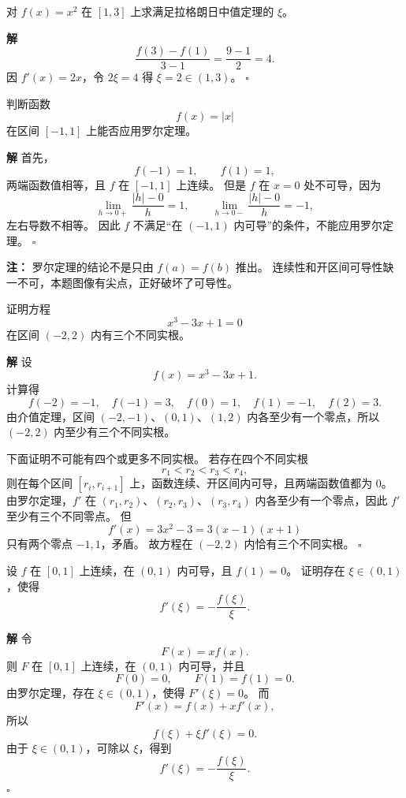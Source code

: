 \documentclass[fontset=fandol]{ctexart}
\newenvironment{solution}{\par\noindent\textbf{解}\quad}{\hfill$\square$\par\vspace{0.8em}}
\newenvironment{warning}{\par\noindent\textbf{注：}\quad}{\par\vspace{0.8em}}
\begin{document}
\begin{example}[验证中值定理]
对 $f(x)=x^2$ 在 $[1,3]$ 上求满足拉格朗日中值定理的 $\xi$。
\end{example}
\begin{solution}
\[
\frac{f(3)-f(1)}{3-1}=\frac{9-1}{2}=4.
\]
因 $f'(x)=2x$，令 $2\xi=4$ 得 $\xi=2\in(1,3)$。
\end{solution}

\begin{example}[罗尔定理的条件核查]
判断函数
\[
f(x)=|x|
\]
在区间 $[-1,1]$ 上能否应用罗尔定理。
\end{example}
\begin{solution}
首先，
\[
f(-1)=1,\qquad f(1)=1,
\]
两端函数值相等，且 $f$ 在 $[-1,1]$ 上连续。 但是 $f$ 在 $x=0$ 处不可导，因为
\[
\lim_{h\to0+}\frac{|h|-0}{h}=1,\qquad
\lim_{h\to0-}\frac{|h|-0}{h}=-1,
\]
左右导数不相等。 因此 $f$ 不满足“在 $(-1,1)$ 内可导”的条件，不能应用罗尔定理。
\end{solution}
\begin{warning}
罗尔定理的结论不是只由 $f(a)=f(b)$ 推出。 连续性和开区间可导性缺一不可，本题图像有尖点，正好破坏了可导性。
\end{warning}

\begin{example}[罗尔定理证明方程根的个数]
证明方程
\[
x^3-3x+1=0
\]
在区间 $(-2,2)$ 内有三个不同实根。
\end{example}
\begin{solution}
设
\[
f(x)=x^3-3x+1.
\]
计算得
\[
f(-2)=-1,\quad f(-1)=3,\quad f(0)=1,\quad f(1)=-1,\quad f(2)=3.
\]
由介值定理，区间 $(-2,-1)$、$(0,1)$、$(1,2)$ 内各至少有一个零点，所以 $(-2,2)$ 内至少有三个不同实根。

下面证明不可能有四个或更多不同实根。 若存在四个不同实根
\[
r_1<r_2<r_3<r_4,
\]
则在每个区间 $[r_i,r_{i+1}]$ 上，函数连续、开区间内可导，且两端函数值都为 $0$。 由罗尔定理，$f'$ 在 $(r_1,r_2)$、$(r_2,r_3)$、$(r_3,r_4)$ 内各至少有一个零点，因此 $f'$ 至少有三个不同零点。 但
\[
f'(x)=3x^2-3=3(x-1)(x+1)
\]
只有两个零点 $-1,1$，矛盾。 故方程在 $(-2,2)$ 内恰有三个不同实根。
\end{solution}

\begin{example}[构造辅助函数]
设 $f$ 在 $[0,1]$ 上连续，在 $(0,1)$ 内可导，且 $f(1)=0$。 证明存在 $\xi\in(0,1)$，使得
\[
f'(\xi)=-\frac{f(\xi)}{\xi}.
\]
\end{example}
\begin{solution}
令
\[
F(x)=xf(x).
\]
则 $F$ 在 $[0,1]$ 上连续，在 $(0,1)$ 内可导，并且
\[
F(0)=0,\qquad F(1)=f(1)=0.
\]
由罗尔定理，存在 $\xi\in(0,1)$，使得 $F'(\xi)=0$。 而
\[
F'(x)=f(x)+xf'(x),
\]
所以
\[
f(\xi)+\xi f'(\xi)=0.
\]
由于 $\xi\in(0,1)$，可除以 $\xi$，得到
\[
f'(\xi)=-\frac{f(\xi)}{\xi}.
\]
\end{solution}
\end{document}
